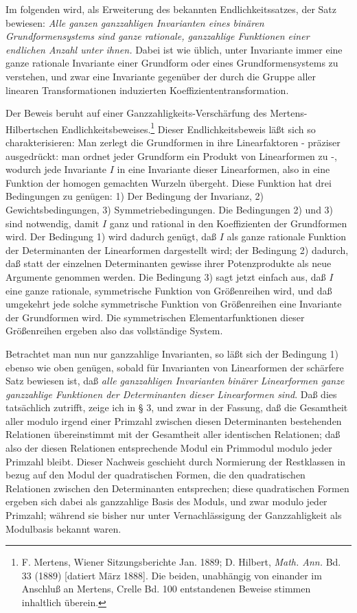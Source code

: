 \documentclass[11pt]{article}
\begin{document}
Im folgenden wird, als Erweiterung des bekannten Endlichkeitssatzes, der Satz bewiesen:
\emph{Alle ganzen ganzzahligen Invarianten eines binären Grundformensystems sind ganze rationale, ganzzahlige Funktionen einer endlichen Anzahl unter ihnen.}
Dabei ist wie üblich, unter \glqq Invariante\grqq{} immer eine ganze rationale Invariante einer Grundform oder eines Grundformensystems zu verstehen, und zwar eine Invariante gegenüber der durch die Gruppe aller linearen Transformationen induzierten Koeffiziententransformation.

Der Beweis beruht auf einer Ganzzahligkeits-Verschärfung des Mertens-Hilbertschen Endlichkeitsbeweises.\footnote{F. Mertens, Wiener Sitzungsberichte Jan. 1889; D. Hilbert, \emph{Math. Ann.} Bd. 33 (1889) [datiert März 1888]. Die beiden, unabhängig von einander im Anschluß an Mertens, Crelle Bd. 100 entstandenen Beweise stimmen inhaltlich überein.}
Dieser Endlichkeitsbeweis läßt sich so charakterisieren: Man zerlegt die Grundformen in ihre Linearfaktoren - präziser ausgedrückt: man ordnet jeder Grundform ein Produkt von Linearformen zu -, wodurch jede Invariante \(I\) in eine Invariante dieser Linearformen, also in eine Funktion der homogen gemachten Wurzeln übergeht. Diese Funktion hat drei Bedingungen zu genügen: 1) Der Bedingung der Invarianz, 2) Gewichtsbedingungen, 3) Symmetriebedingungen. Die Bedingungen 2) und 3) sind notwendig, damit \(I\) ganz und rational in den Koeffizienten der Grundformen wird. Der Bedingung 1) wird dadurch genügt, daß \(I\) als ganze rationale Funktion der Determinanten der Linearformen dargestellt wird; der Bedingung 2) dadurch, daß statt der einzelnen Determinanten gewisse ihrer Potenzprodukte als neue Argumente genommen werden. Die Bedingung 3) sagt jetzt einfach aus, daß \(I\) eine ganze rationale, symmetrische Funktion von Größenreihen wird, und daß umgekehrt jede solche symmetrische Funktion von Größenreihen eine Invariante der Grundformen wird. Die symmetrischen Elementarfunktionen dieser Größenreihen ergeben also das vollständige System.

Betrachtet man nun nur ganzzahlige Invarianten, so läßt sich der Bedingung 1) ebenso wie oben genügen, sobald für Invarianten von Linearformen der schärfere Satz bewiesen ist, daß \emph{alle ganzzahligen Invarianten binärer Linearformen ganze ganzzahlige Funktionen der Determinanten dieser Linearformen sind}. Daß dies tatsächlich zutrifft, zeige ich in § 3, und zwar in der Fassung, daß die Gesamtheit aller modulo irgend einer Primzahl zwischen diesen Determinanten bestehenden Relationen übereinstimmt mit der Gesamtheit aller identischen Relationen; daß also der diesen Relationen entsprechende Modul ein Primmodul modulo jeder Primzahl bleibt. Dieser Nachweis geschieht durch Normierung der Restklassen in bezug auf den Modul der quadratischen Formen, die den quadratischen Relationen zwischen den Determinanten entsprechen; diese quadratischen Formen ergeben sich dabei als ganzzahlige Basis des Moduls, und zwar modulo jeder Primzahl; während sie bisher nur unter Vernachlässigung der Ganzzahligkeit als Modulbasis bekannt waren.
\end{document}
